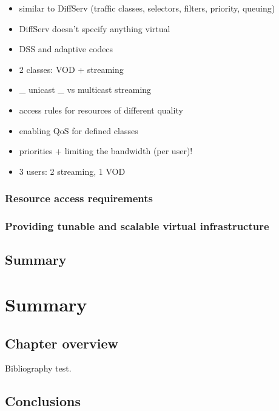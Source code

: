 \documentclass[11pt]{book}
\begin{document}
        \begin{itemize}
          \item similar to DiffServ (traffic classes, selectors, filters, priority, queuing)
          \item DiffServ doesn't specify anything virtual
          \item DSS and adaptive codecs
        \end{itemize}

        \begin{itemize}
          \item 2 classes: VOD + streaming
          \item \_ unicast \_ vs multicast streaming
          \item access rules for resources of different quality
          \item enabling QoS for defined classes
          \item priorities + limiting the bandwidth (per user)!
          \item 3 users: 2 streaming, 1 VOD
        \end{itemize}


      \subsection{Resource access requirements}

      \subsection{Providing tunable and scalable virtual infrastructure}


    \section*{Summary}


  \chapter{Summary}

    \section*{Chapter overview}

      Bibliography \cite{mittelbach2004} test.
	
		

    \section{Conclusions}
	
\end{document}
